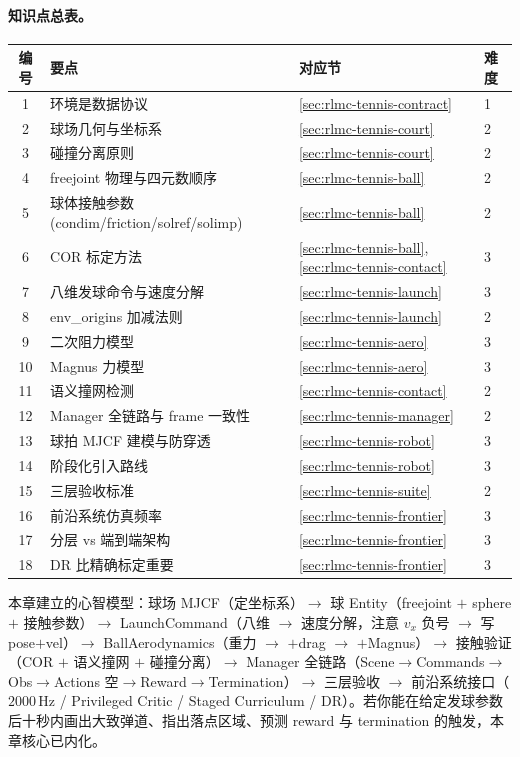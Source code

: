 \paragraph{知识点总表。}
\begin{center}
\small
\begin{tabular}{@{}clll@{}}
\toprule
编号 & 要点 & 对应节 & 难度 \\
\midrule
1 & 环境是数据协议 & \cref{sec:rlmc-tennis-contract} & 1 \\
2 & 球场几何与坐标系 & \cref{sec:rlmc-tennis-court} & 2 \\
3 & 碰撞分离原则 & \cref{sec:rlmc-tennis-court} & 2 \\
4 & freejoint 物理与四元数顺序 & \cref{sec:rlmc-tennis-ball} & 2 \\
5 & 球体接触参数(condim/friction/solref/solimp) & \cref{sec:rlmc-tennis-ball} & 2 \\
6 & COR 标定方法 & \cref{sec:rlmc-tennis-ball}, \cref{sec:rlmc-tennis-contact} & 3 \\
7 & 八维发球命令与速度分解 & \cref{sec:rlmc-tennis-launch} & 3 \\
8 & env\_origins 加减法则 & \cref{sec:rlmc-tennis-launch} & 2 \\
9 & 二次阻力模型 & \cref{sec:rlmc-tennis-aero} & 3 \\
10 & Magnus 力模型 & \cref{sec:rlmc-tennis-aero} & 3 \\
11 & 语义撞网检测 & \cref{sec:rlmc-tennis-contact} & 2 \\
12 & Manager 全链路与 frame 一致性 & \cref{sec:rlmc-tennis-manager} & 2 \\
13 & 球拍 MJCF 建模与防穿透 & \cref{sec:rlmc-tennis-robot} & 3 \\
14 & 阶段化引入路线 & \cref{sec:rlmc-tennis-robot} & 3 \\
15 & 三层验收标准 & \cref{sec:rlmc-tennis-suite} & 2 \\
16 & 前沿系统仿真频率 & \cref{sec:rlmc-tennis-frontier} & 3 \\
17 & 分层 vs 端到端架构 & \cref{sec:rlmc-tennis-frontier} & 3 \\
18 & DR 比精确标定重要 & \cref{sec:rlmc-tennis-frontier} & 3 \\
\bottomrule
\end{tabular}
\end{center}

本章建立的心智模型：球场 MJCF（定坐标系）$\to$ 球 Entity（freejoint $+$ sphere $+$ 接触参数）$\to$ LaunchCommand（八维 $\to$ 速度分解，注意 $v_x$ 负号 $\to$ 写 pose$+$vel）$\to$ BallAerodynamics（重力 $\to$ $+$drag $\to$ $+$Magnus）$\to$ 接触验证（COR $+$ 语义撞网 $+$ 碰撞分离）$\to$ Manager 全链路（Scene$\to$Commands$\to$Obs$\to$Actions 空$\to$Reward$\to$Termination）$\to$ 三层验收 $\to$ 前沿系统接口（$2000$\,Hz / Privileged Critic / Staged Curriculum / DR）。若你能在给定发球参数后十秒内画出大致弹道、指出落点区域、预测 reward 与 termination 的触发，本章核心已内化。

